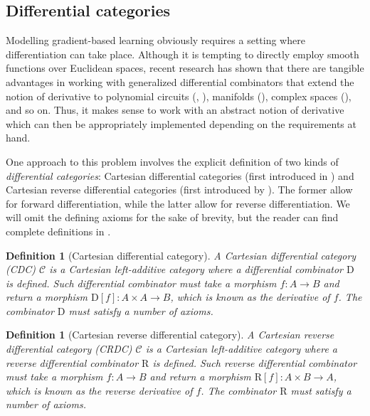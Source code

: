 \documentclass[11pt,a4paper,openright,twoside]{report}
\newcounter{mycounter}
\theoremstyle{plain}
\newtheorem{definition}[mycounter]{Definition}
\theoremstyle{definition}
\begin{document}
\subsection{Differential categories}
\label{subsec: diffcats}

Modelling gradient-based learning obviously requires a setting where differentiation can take place. Although it is tempting to directly employ smooth functions over Euclidean spaces, recent research has shown that there are tangible advantages in working with generalized differential combinators that extend the notion of derivative to polynomial circuits (\cite{wilson2022categories}, \cite{wilson2021reverse}), manifolds (\cite{peng2021hyperbolic}), complex spaces (\cite{bassey2021survey}), and so on.  Thus, it makes sense to work with an abstract notion of derivative which can then be appropriately implemented depending on the requirements at hand.

One approach to this problem involves the explicit definition of two kinds of \textit{differential categories}: Cartesian differential categories (first introduced in \cite{blute2006differential}) and Cartesian reverse differential categories (first introduced by \cite{cockett2019reverse}). The former allow for forward differentiation, while the latter allow for reverse differentiation. We will omit the defining axioms for the sake of brevity, but the reader can find complete definitions in \cite{cockett2019reverse}.

\begin{definition}[Cartesian differential category]
  \label{def: cdc}
  A Cartesian differential category (CDC) $\mathcal{C}$ is a Cartesian left-additive category where a differential combinator $\mathrm{D}$ is defined. Such differential combinator must take a morphism $f: A \to B$ and return a morphism $\mathrm{D}[f]: A \times A \to B$, which is known as the derivative of $f$. The combinator $\mathrm{D}$ must satisfy a number of axioms. 
\end{definition}

\begin{definition}[Cartesian reverse differential category]
  A Cartesian reverse differential category (CRDC) $\mathcal{C}$ is a Cartesian left-additive category where a reverse differential combinator $\mathrm{R}$ is defined. Such reverse differential combinator must take a morphism $f: A \to B$ and return a morphism $\mathrm{R}[f]: A \times B \to A$, which is known as the reverse derivative of $f$. The combinator $\mathrm{R}$ must satisfy a number of axioms. 
\end{definition}
\end{document}
